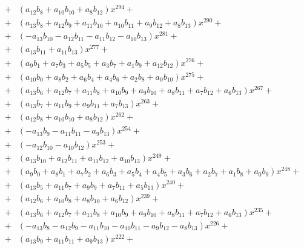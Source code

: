 \documentclass{article}
\begin{document}
\begin{eqnarray*}
&+&   \left(a_{12} b_{8} + a_{10} b_{10} + a_{8} b_{12}\right) x^{294}  + \\
&+&   \left(a_{13} b_{8} + a_{12} b_{9} + a_{11} b_{10} + a_{10} b_{11} + a_{9} b_{12} + a_{8} b_{13}\right) x^{290}  + \\
&+&   \left(- a_{13} b_{10} -  a_{12} b_{11} -  a_{11} b_{12} -  a_{10} b_{13}\right) x^{281}  + \\
&+&   \left(a_{13} b_{11} + a_{11} b_{13}\right) x^{277}  + \\
&+&   \left(a_{9} b_{1} + a_{7} b_{3} + a_{5} b_{5} + a_{3} b_{7} + a_{1} b_{9} + a_{12} b_{12}\right) x^{276}  + \\
&+&   \left(a_{10} b_{0} + a_{8} b_{2} + a_{6} b_{4} + a_{4} b_{6} + a_{2} b_{8} + a_{0} b_{10}\right) x^{275}  + \\
&+&   \left(a_{13} b_{6} + a_{12} b_{7} + a_{11} b_{8} + a_{10} b_{9} + a_{9} b_{10} + a_{8} b_{11} + a_{7} b_{12} + a_{6} b_{13}\right) x^{267}  + \\
&+&   \left(a_{13} b_{7} + a_{11} b_{9} + a_{9} b_{11} + a_{7} b_{13}\right) x^{263}  + \\
&+&   \left(a_{12} b_{8} + a_{10} b_{10} + a_{8} b_{12}\right) x^{262}  + \\
&+&   \left(- a_{13} b_{9} -  a_{11} b_{11} -  a_{9} b_{13}\right) x^{254}  + \\
&+&   \left(- a_{12} b_{10} -  a_{10} b_{12}\right) x^{253}  + \\
&+&   \left(a_{13} b_{10} + a_{12} b_{11} + a_{11} b_{12} + a_{10} b_{13}\right) x^{249}  + \\
&+&   \left(a_{9} b_{0} + a_{8} b_{1} + a_{7} b_{2} + a_{6} b_{3} + a_{5} b_{4} + a_{4} b_{5} + a_{3} b_{6} + a_{2} b_{7} + a_{1} b_{8} + a_{0} b_{9}\right) x^{248}  + \\
&+&   \left(a_{13} b_{5} + a_{11} b_{7} + a_{9} b_{9} + a_{7} b_{11} + a_{5} b_{13}\right) x^{240}  + \\
&+&   \left(a_{12} b_{6} + a_{10} b_{8} + a_{8} b_{10} + a_{6} b_{12}\right) x^{239}  + \\
&+&   \left(a_{13} b_{6} + a_{12} b_{7} + a_{11} b_{8} + a_{10} b_{9} + a_{9} b_{10} + a_{8} b_{11} + a_{7} b_{12} + a_{6} b_{13}\right) x^{235}  + \\
&+&   \left(- a_{13} b_{8} -  a_{12} b_{9} -  a_{11} b_{10} -  a_{10} b_{11} -  a_{9} b_{12} -  a_{8} b_{13}\right) x^{226}  + \\
&+&   \left(a_{13} b_{9} + a_{11} b_{11} + a_{9} b_{13}\right) x^{222}  + \\

\end{eqnarray*}
\end{document}
